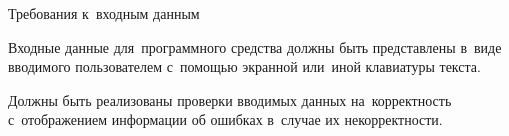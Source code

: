 \subsubsection{} Требования к~входным данным
\label{sec:analysis:research:req:inputs}

Входные данные для~программного средства должны быть представлены в~виде вводимого пользователем с~помощью экранной или~иной клавиатуры текста.

Должны быть реализованы проверки вводимых данных на~корректность с~отображением информации об ошибках в~случае их некорректности.